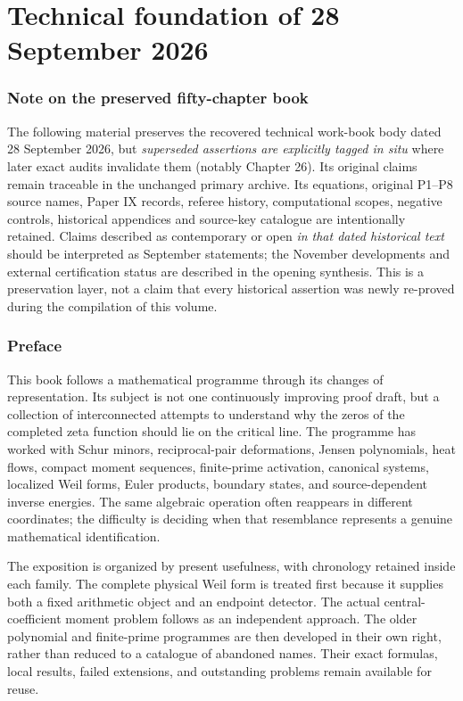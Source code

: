 \documentclass[
  10pt,
  a4paper,
  10pt,
  oneside,
  openany]{book}
\begin{document}
\part{Technical foundation of 28 September 2026}

\section*{Note on the preserved fifty-chapter
book}\label{note-on-the-preserved-fifty-chapter-book}

The following material preserves the recovered technical work-book body
dated 28 September 2026, but \emph{superseded assertions are explicitly
tagged in situ} where later exact audits invalidate them (notably
Chapter 26). Its original claims remain traceable in the unchanged
primary archive. Its equations, original P1--P8 source names, Paper IX
records, referee history, computational scopes, negative controls,
historical appendices and source-key catalogue are intentionally
retained. Claims described as contemporary or open \emph{in that dated
historical text} should be interpreted as September statements; the
November developments and external certification status are described in
the opening synthesis. This is a preservation layer, not a claim that
every historical assertion was newly re-proved during the compilation of
this volume.

\section*{Preface}\label{preface}

This book follows a mathematical programme through its changes of
representation. Its subject is not one continuously improving proof
draft, but a collection of interconnected attempts to understand why the
zeros of the completed zeta function should lie on the critical line.
The programme has worked with Schur minors, reciprocal-pair
deformations, Jensen polynomials, heat flows, compact moment sequences,
finite-prime activation, canonical systems, localized Weil forms, Euler
products, boundary states, and source-dependent inverse energies. The
same algebraic operation often reappears in different coordinates; the
difficulty is deciding when that resemblance represents a genuine
mathematical identification.

The exposition is organized by present usefulness, with chronology
retained inside each family. The complete physical Weil form is treated
first because it supplies both a fixed arithmetic object and an endpoint
detector. The actual central-coefficient moment problem follows as an
independent approach. The older polynomial and finite-prime programmes
are then developed in their own right, rather than reduced to a
catalogue of abandoned names. Their exact formulas, local results,
failed extensions, and outstanding problems remain available for reuse.
\end{document}
